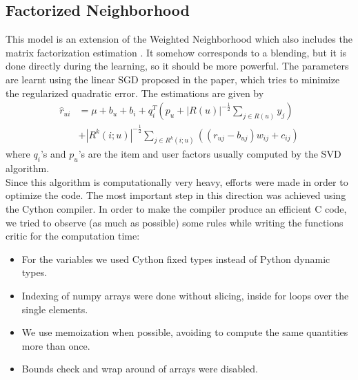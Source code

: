 \documentclass[10pt,conference,compsocconf]{IEEEtran}
\begin{document}
\subsection{Factorized Neighborhood}
This model is an extension of the Weighted Neighborhood which also includes the matrix factorization estimation \cite{koren2008factorization}. It somehow corresponds to a blending, but it is done directly during the learning, so it should be more powerful. The parameters are learnt using the linear SGD proposed in the paper, which tries to minimize the regularized quadratic error. The estimations are given by
\begin{align}
\hat{r}_{ui} &= \mu + b_{u} + b_{i} + q_{i}^{T}(p_{u} + |R(u)|^{-\frac{1}{2}} \sum_{j \in R(u)}y_{j}) \nonumber \\
&+ |R^{k}(i;u)|^{-\frac{1}{2}} \sum_{j \in R^{k}(i;u)} ((r_{uj}-b_{uj})w_{ij} + c_{ij} )
\end{align}
where $q_{i}$'s and $p_{u}$'s are the item and user factors usually computed by the SVD algorithm. \\
Since this algorithm is computationally very heavy, efforts were made in order to optimize the code. The most important step in this direction was achieved using the Cython compiler.  In order to make the compiler produce an efficient C code, we tried to observe (as much as possible) some rules while writing the functions critic for the computation time:
\begin{itemize}
\item For the variables we used Cython fixed types instead of Python dynamic types.
\item Indexing of numpy arrays were done without slicing, inside for loops over the single elements.
\item We use memoization when possible, avoiding to compute the same quantities more than once.
\item Bounds check and wrap around of arrays were disabled.
\end{itemize}
\end{document}
